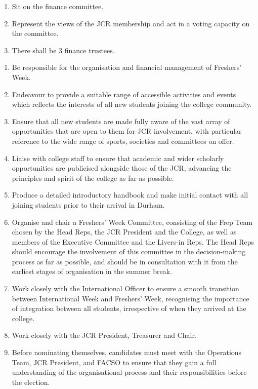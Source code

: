 \begin{enumerate}
    \item Sit on the finance committee.
    \item Represent the views of the JCR membership and act in a voting capacity on the committee. 
    \item There shall be 3 finance trustees.

    
\end{enumerate}


\begin{enumerate}
    \item Be responsible for the organisation and financial management of Freshers' Week.
    \item Endeavour to provide a suitable range of accessible activities and events which reflects the interests of all new students joining the college community.
    \item Ensure that all new students are made fully aware of the vast array of opportunities that are open to them for JCR involvement, with particular reference to the wide range of sports, societies and committees on offer.
    \item Liaise with college staff to ensure that academic and wider scholarly opportunities are publicised alongside those of the JCR, advancing the principles and spirit of the college as far as possible.
    \item Produce a detailed introductory handbook and make initial contact with all joining students prior to their arrival in Durham.
    \item Organise and chair a Freshers' Week Committee, consisting of the Frep Team chosen by the Head Reps, the JCR President and the College, as well as members of the Executive Committee and the Livers-in Reps. The Head Reps should encourage the involvement of this committee in the decision-making process as far as possible, and should be in consultation with it from the earliest stages of organisation in the summer break.
    \item Work closely with the International Officer to ensure a smooth transition between International Week and Freshers' Week, recognising the importance of integration between all students, irrespective of when they arrived at the college.
    \item Work closely with the JCR President, Treasurer and Chair.
    \item Before nominating themselves, candidates must meet with the Operations Team, JCR President, and FACSO to ensure that they gain a full understanding of the organisational process and their responsibilities before the election.
    
\end{enumerate}

